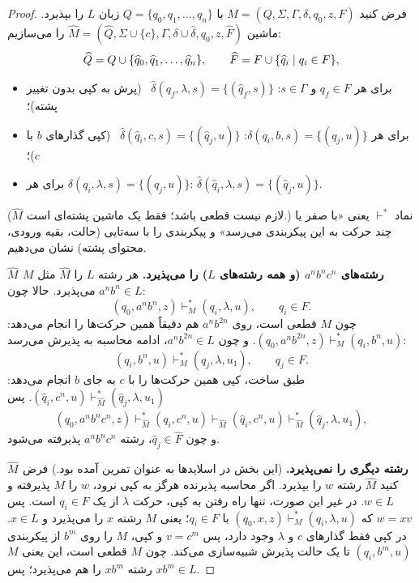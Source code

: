 \begin{proof}
فرض کنید  $M=(Q,\Sigma,\Gamma,\delta,q_0,z,F)$ با $Q=\{q_0,q_1,\dots,q_n\}$ زبان $L$ را بپذیرد. ماشین $\widehat M=(\widehat Q,\Sigma\cup\{c\},\Gamma,\delta\cup\widehat\delta,q_0,z,\widehat F)$ را می‌سازیم:
\[\widehat Q=Q\cup\{\widehat q_0,\widehat q_1,\dots,\widehat q_n\},\qquad \widehat F=F\cup\{\widehat q_i\mid q_i\in F\},\]
\begin{itemize}
\item برای هر $q_f\in F$ و $s\in\Gamma$: \quad $\widehat\delta(q_f,\lambda,s)=\{(\widehat q_f,s)\}$ \ (پرش به کپی بدون تغییر پشته)؛
\item برای هر $\delta(q_i,b,s)=\{(q_j,u)\}$: \quad $\widehat\delta(\widehat q_i,c,s)=\{(\widehat q_j,u)\}$ \ (کپی گذارهای $b$ با $c$)؛
\item برای هر $\delta(q_i,\lambda,s)=\{(q_j,u)\}$: \quad $\widehat\delta(\widehat q_i,\lambda,s)=\{(\widehat q_j,u)\}$.
\end{itemize}
($\widehat M$ لازم نیست قطعی باشد؛ فقط یک ماشین پشته‌ای است.) نماد $\vdash^*$ یعنی «با صفر یا چند حرکت به این پیکربندی می‌رسد» و پیکربندی را با سه‌تایی (حالت، بقیه ورودی، محتوای پشته) نشان می‌دهیم.

\textbf{$\widehat M$ رشته‌های $a^nb^nc^n$ (و همه رشته‌های $L$) را می‌پذیرد.} هر رشته $L$ را $\widehat M$ مثل $M$ می‌پذیرد. حالا چون $a^nb^n\in L$:
\[(q_0,a^nb^n,z)\vdash^*_M(q_i,\lambda,u),\qquad q_i\in F.\]
چون $M$ قطعی است، روی $a^nb^{2n}$ هم دقیقاً همین حرکت‌ها را انجام می‌دهد: $(q_0,a^nb^{2n},z)\vdash^*_M(q_i,b^n,u)$. و چون $a^nb^{2n}\in L$، ادامه محاسبه به پذیرش می‌رسد:
\[(q_i,b^n,u)\vdash^*_M(q_j,\lambda,u_1),\qquad q_j\in F.\]
طبق ساخت، کپی همین حرکت‌ها را با $c$ به جای $b$ انجام می‌دهد: $(\widehat q_i,c^n,u)\vdash^*_{\widehat M}(\widehat q_j,\lambda,u_1)$. پس
\[(q_0,a^nb^nc^n,z)\vdash^*_{\widehat M}(q_i,c^n,u)\vdash_{\widehat M}(\widehat q_i,c^n,u)\vdash^*_{\widehat M}(\widehat q_j,\lambda,u_1),\]
و چون $\widehat q_j\in\widehat F$، رشته $a^nb^nc^n$ پذیرفته می‌شود.

\textbf{$\widehat M$ رشته دیگری را نمی‌پذیرد.} (این بخش در اسلایدها به عنوان تمرین آمده بود.) فرض کنید $\widehat M$ رشته $w$ را بپذیرد. اگر محاسبه پذیرنده هرگز به کپی نرود، $w$ را $M$ پذیرفته و $w\in L$. در غیر این صورت، تنها راه رفتن به کپی، حرکت $\lambda$ از یک $q_i\in F$ است. پس $w=xv$ که $(q_0,x,z)\vdash^*_M(q_i,\lambda,u)$ با $q_i\in F$؛ یعنی $M$ رشته $x$ را می‌پذیرد و $x\in L$. در کپی فقط گذارهای $c$ و $\lambda$ وجود دارد، پس $v=c^m$ و کپی، $M$ را روی $b^m$ از پیکربندی $(q_i,b^m,u)$ تا یک حالت پذیرش شبیه‌سازی می‌کند. چون $M$ قطعی است، این یعنی $M$ رشته $xb^m$ را هم می‌پذیرد؛ پس $xb^m\in L$.


\end{proof}
